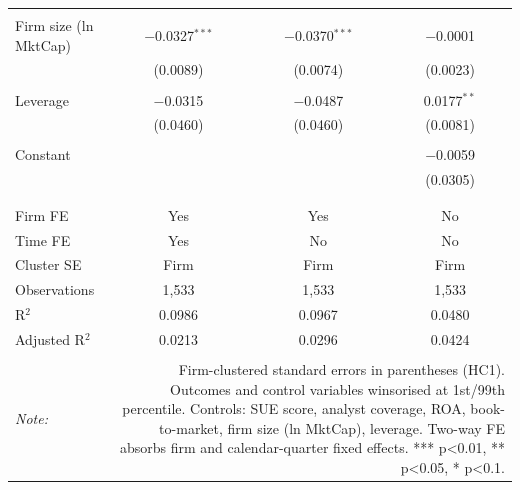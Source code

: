 \begin{table}[!htbp]
\begin{tabular}{@{\extracolsep{5pt}}lccc}
  & & & \\ 
 Firm size (ln MktCap) & $-$0.0327$^{***}$ & $-$0.0370$^{***}$ & $-$0.0001 \\ 
  & (0.0089) & (0.0074) & (0.0023) \\ 
  & & & \\ 
 Leverage & $-$0.0315 & $-$0.0487 & 0.0177$^{**}$ \\ 
  & (0.0460) & (0.0460) & (0.0081) \\ 
  & & & \\ 
 Constant &  &  & $-$0.0059 \\ 
  &  &  & (0.0305) \\ 
  & & & \\ 
\hline \\[-1.8ex] 
Firm FE & Yes & Yes & No \\ 
Time FE & Yes & No & No \\ 
Cluster SE & Firm & Firm & Firm \\ 
Observations & 1,533 & 1,533 & 1,533 \\ 
R$^{2}$ & 0.0986 & 0.0967 & 0.0480 \\ 
Adjusted R$^{2}$ & 0.0213 & 0.0296 & 0.0424 \\ 
\hline 
\hline \\[-1.8ex] 
\textit{Note:}  & \multicolumn{3}{r}{Firm-clustered standard errors in parentheses (HC1). Outcomes and control variables winsorised at 1st/99th percentile. Controls: SUE score, analyst coverage, ROA, book-to-market, firm size (ln MktCap), leverage. Two-way FE absorbs firm and calendar-quarter fixed effects. *** p<0.01, ** p<0.05, * p<0.1.} \\ 
\end{tabular} 
\end{table} 
